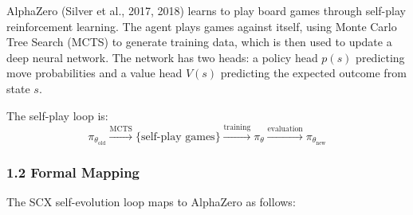 \documentclass[
  12pt,
]{article}
\begin{document}
AlphaZero (Silver et al., 2017, 2018) learns to play board games through
self-play reinforcement learning. The agent plays games against itself,
using Monte Carlo Tree Search (MCTS) to generate training data, which is
then used to update a deep neural network. The network has two heads: a
policy head \(p(s)\) predicting move probabilities and a value head
\(V(s)\) predicting the expected outcome from state \(s\).

The self-play loop is:
\[\pi_{\theta_{\text{old}}} \xrightarrow{\text{MCTS}} \{\text{self-play games}\} \xrightarrow{\text{training}} \pi_\theta \xrightarrow{\text{evaluation}} \pi_{\theta_{\text{new}}}\]

\subsubsection{1.2 Formal Mapping}\label{formal-mapping}

The SCX self-evolution loop maps to AlphaZero as follows:
\end{document}
